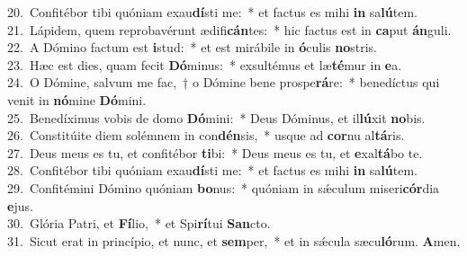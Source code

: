 {20.~}Confitébor tibi quóniam exau\textbf{dí}sti me:~* et factus es mihi \textbf{in} sa\textbf{lú}tem.\\
{21.~}Lápidem, quem reprobavérunt ædifi\textbf{cán}tes:~* hic factus est in \textbf{ca}put \textbf{án}guli.\\
{22.~}A Dómino factum est \textbf{i}stud:~* et est mirábile in \textbf{ó}culis \textbf{no}stris.\\
{23.~}Hæc est dies, quam fecit \textbf{Dó}minus:~* exsultémus et læ\textbf{té}mur in \textbf{e}a.\\
{24.~}O Dómine, salvum me fac,~† o Dómine bene prospe\textbf{rá}re:~* benedíctus qui venit in \textbf{nó}mine \textbf{Dó}mini.\\
{25.~}Benedíximus vobis de domo \textbf{Dó}mini:~* Deus Dóminus, et il\textbf{lú}xit \textbf{no}bis.\\
{26.~}Constitúite diem solémnem in con\textbf{dén}sis,~* usque ad \textbf{cor}nu al\textbf{tá}ris.\\
{27.~}Deus meus es tu, et confitébor \textbf{ti}bi:~* Deus meus es tu, et \textbf{e}xal\textbf{tá}bo te.\\
{28.~}Confitébor tibi quóniam exau\textbf{dí}sti me:~* et factus es mihi \textbf{in} sa\textbf{lú}tem.\\
{29.~}Confitémini Dómino quóniam \textbf{bo}nus:~* quóniam in sǽculum miseri\textbf{cór}dia \textbf{e}jus.\\
{30.~}Glória Patri, et \textbf{Fí}lio,~* et Spi\textbf{rí}tui \textbf{San}cto.\\
{31.~}Sicut erat in princípio, et nunc, et \textbf{sem}per,~* et in sǽcula sæcu\textbf{ló}rum. \textbf{A}men.\\
